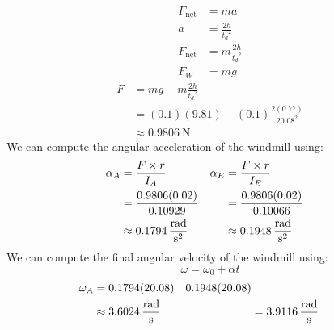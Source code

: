 \documentclass[article, 11pt]{article}
\begin{document}
    \begin{align*}
        F_\text{net} &= ma \\
        a &= \frac{2h}{{t_d}^2} \\
        F_\text{net} &= m\frac{2h}{{t_d}^2} \\
        F_W &= mg
    \end{align*}
    \begin{align*}
        F &= mg - m\frac{2h}{{t_d}^2} \\
          &= (0.1)(9.81) - (0.1)\frac{2(0.77)}{20.08^2} \\
          &\approx \SI{0.9806}{\newton}
    \end{align*}
    We can compute the angular acceleration of the windmill using:
    \begin{alignat*}{2}
        \begin{aligned}
            \alpha_A  &= \frac{F \times r}{I_A} \\
                      &= \frac{0.9806(0.02)}{0.10929} \\
                      &\approx \SI{0.1794}{\frac{\radian}{\second^2}}
        \end{aligned} \quad &
        \begin{aligned}
            \alpha_E &= \frac{F \times r}{I_E} \\
                     &= \frac{0.9806(0.02)}{0.10066} \\
                     &\approx \SI{0.1948}{\frac{\radian}{\second^2}}
        \end{aligned}
    \end{alignat*}
    We can compute the final angular velocity of the windmill using:
    \begin{equation*}
        \omega = \omega_0 + \alpha t
    \end{equation*}
    \begin{alignat*}{2}
        \begin{aligned}
            \omega_A &= 0.1794(20.08) \\
                     &\approx \SI{3.6024}{\frac{\radian}{\second}}
        \end{aligned} \quad &
        \begin{aligned}0.1948(20.08) \\
                     &= \SI{3.9116}{\frac{\radian}{\second}}
        \end{aligned}
    \end{alignat*}
\end{document}
